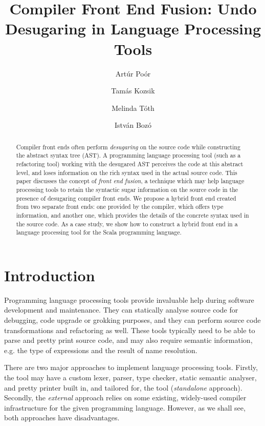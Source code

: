 \documentclass[11pt]{amsart}
\title{Compiler Front End Fusion: Undo Desugaring in Language
  Processing Tools}
\author{Art\'ur Po\'or}
\author{Tam\'as Kozsik}
\author{Melinda T\'oth}
\author{Istv\'an Boz\'o}
\begin{document}

\begin{abstract}
  Compiler front ends often perform \emph{desugaring} on the source code
  while constructing the abstract syntax tree (AST).  A programming
  language processing tool (such as a refactoring tool) working with
  the desugared AST perceives the code at
  this abstract level, and loses information on the rich syntax used
  in the actual source code.  This paper discusses the concept of
  \emph{front end fusion}, a technique which may help language
  processing tools to retain the syntactic sugar information on the
  source code in the presence of desugaring compiler front ends. We
  propose a hybrid front end created from two separate front ends: one
  provided by the compiler, which offers type information, and
  another one, which provides the details of the concrete syntax used in the
  source code.
  As a case study, we show how to construct a hybrid front end in a
  language processing tool for the Scala programming language.
\end{abstract}

\maketitle

\section{Introduction}

Programming language processing tools provide invaluable help during
software development and maintenance. They can statically analyse source code for
debugging, code upgrade or grokking purposes, and they can perform
source code transformations and refactoring as well.
These tools typically need to be able to parse and pretty print
source code, and may also require semantic information, e.g. the type
of expressions and the result of name resolution.

There are two major approaches to implement language processing tools.
Firstly, the tool may have a custom lexer, parser, type checker,
static semantic analyser, and pretty printer built in, and tailored
for, the tool (\emph{standalone} approach).  Secondly, the
\emph{external} approach relies on some existing, widely-used compiler
infrastructure for the given programming language. However, as we
shall see, both approaches have disadvantages.
\end{document}
